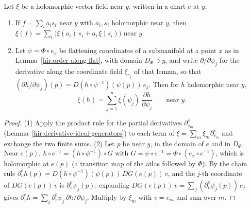 \begin{lemma}
\label{mc:field-chain-rule}
\leanok
Let \(\xi\) be a holomorphic vector field near \(y\), written in a chart \(e\) at \(y\).
\begin{enumerate}
\item If \(f=\sum_ia_is_i\) near \(y\) with \(a_i,s_i\) holomorphic near \(y\), then \(\xi(f)=\sum_i\big(\xi(a_i)\,s_i+a_i\,\xi(s_i)\big)\) near \(y\).
\item Let \(\psi=\Phi\circ e_x\) be flattening coordinates of a submanifold at a point \(x\) as in Lemma~\ref{hir:order-along-flat}, with
domain \(D_\Phi\ni y\), and write \(\partial/\partial\psi_j\) for the derivative along the coordinate field \(\xi_{e_j}\) of that lemma, so that
\((\partial h/\partial\psi_j)(p)=D(h\circ\psi^{-1})(\psi(p))\,e_j\). Then for \(h\) holomorphic near \(y\),
\[\xi(h)=\sum_{j=1}^n\xi(\psi_j)\,\frac{\partial h}{\partial\psi_j}\qquad\text{near }y.\]
\end{enumerate}
\end{lemma}
\begin{proof}
\leanok
(1) Apply the product rule for the partial derivatives \(\partial^e_{e_m}\) (Lemma~\ref{hir:derivative-ideal-generators}) to each term of
\(\xi=\sum_m\xi_m\partial^e_{e_m}\) and exchange the two finite sums.
(2) Let \(p\) be near \(y\), in the domain of \(e\) and in \(D_\Phi\). Near \(e(p)\), \(h\circ e^{-1}=(h\circ\psi^{-1})\circ G\) with
\(G=\psi\circ e^{-1}=\Phi\circ(e_x\circ e^{-1})\), which is holomorphic at \(e(p)\) (a transition map of the atlas followed by \(\Phi\)). By the chain rule
\(\partial^e_vh(p)=D(h\circ\psi^{-1})(\psi(p))\,DG(e(p))\,v\), and the \(j\)-th coordinate of \(DG(e(p))\,v\) is \(\partial^e_v\psi_j(p)\); expanding
\(DG(e(p))\,v=\sum_j(\partial^e_v\psi_j(p))\,e_j\) gives \(\partial^e_vh=\sum_j\partial^e_v\psi_j\,\partial h/\partial\psi_j\). Multiply by \(\xi_m\) with \(v=e_m\) and sum
over \(m\).
\end{proof}

